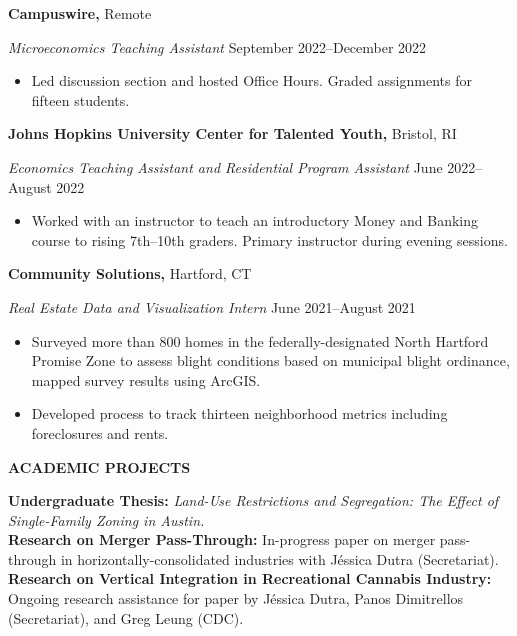 \documentclass[11pt]{article}
\begin{document}
\textbf{Campuswire,} \hfill Remote

\textit{Microeconomics Teaching Assistant} \hfill September 2022--December 2022
\begin{itemize}[noitemsep, topsep=0pt, partopsep=0pt, parsep=0pt]
    \item Led discussion section and hosted Office Hours. Graded assignments for fifteen students.
\end{itemize}
\vspace{12pt}

\textbf{Johns Hopkins University Center for Talented Youth,} \hfill Bristol, RI

\textit{Economics Teaching Assistant and Residential Program Assistant} \hfill June 2022--August 2022
\begin{itemize}[noitemsep, topsep=0pt, partopsep=0pt, parsep=0pt]
    \item Worked with an instructor to teach an introductory Money and Banking course to rising 7th--10th graders. Primary instructor during evening sessions.
\end{itemize}

\vspace{12pt}

\textbf{Community Solutions,} \hfill Hartford, CT

\textit{Real Estate Data and Visualization Intern} \hfill June 2021--August 2021
\begin{itemize}[noitemsep, topsep=0pt, partopsep=0pt, parsep=0pt]
    \item Surveyed more than 800 homes in the federally-designated North Hartford Promise Zone to assess blight conditions based on municipal blight ordinance, mapped survey results using ArcGIS.
    \item Developed process to track thirteen neighborhood metrics including foreclosures and rents.
\end{itemize}

\begin{center}
    \textbf{ACADEMIC PROJECTS}
\end{center}

\textbf{Undergraduate Thesis:} \textit{Land-Use Restrictions and Segregation: The Effect of Single-Family Zoning in Austin.}\\
\textbf{Research on Merger Pass-Through:} In-progress paper on merger pass-through in horizontally-consolidated industries with J\'essica Dutra (Secretariat). \\
\textbf{Research on Vertical Integration in Recreational Cannabis Industry:} Ongoing research assistance for paper by J\'essica Dutra, Panos Dimitrellos (Secretariat), and Greg Leung (CDC).
\end{document}
